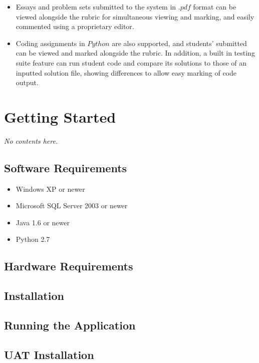 \documentclass{article}
\begin{document}
\begin{itemize}
    \begin{itemize}
      \item Essays and problem sets submitted to the system in $.pdf$ format can be 
	viewed alongside the rubric for simultaneous viewing and marking, and easily 
	commented using a proprietary editor. 
      \item Coding assignments in $Python$ are also supported, and students' submitted
	can be viewed and marked alongside the rubric. In addition, a built in testing
	suite feature can run student code and compare its solutions to those of an
	inputted solution file, showing differences to allow easy marking of code
	output.
    \end{itemize}
\end{itemize}

\section{Getting Started}
\emph{No contents here.}

\subsection{Software Requirements}

\begin{itemize}
	\item Windows XP or newer
	\item Microsoft SQL Server 2003 or newer
	\item Java 1.6 or newer
	\item Python 2.7
\end{itemize}

\subsection{Hardware Requirements}

\subsection{Installation}

\subsection{Running the Application}

\subsection{UAT Installation}
\end{document}
